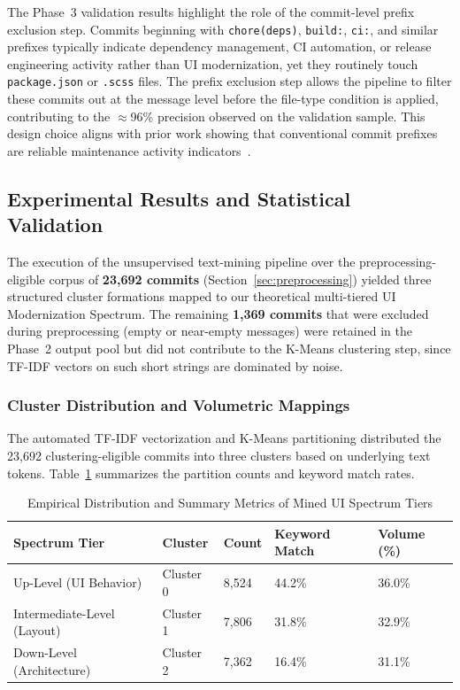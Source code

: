 \documentclass{article}
\begin{document}
The Phase~3 validation results highlight the role of the commit-level
prefix exclusion step. Commits beginning with \texttt{chore(deps)},
\texttt{build:}, \texttt{ci:}, and similar prefixes typically indicate
dependency management, CI automation, or release engineering activity
rather than UI modernization, yet they routinely touch
\texttt{package.json} or \texttt{.scss} files. The prefix exclusion
step allows the pipeline to filter these commits out at the message
level before the file-type condition is applied, contributing to the
$\approx$96\% precision observed on the validation sample. This
design choice aligns with prior work showing that conventional commit
prefixes are reliable maintenance activity
indicators~\cite{levin2017, herzig2013}.

\subsection{Experimental Results and Statistical Validation}

The execution of the unsupervised text-mining pipeline over the
preprocessing-eligible corpus of \textbf{23,692 commits}
(Section~\ref{sec:preprocessing}) yielded three structured cluster
formations mapped to our theoretical multi-tiered UI Modernization
Spectrum. The remaining \textbf{1,369 commits} that were excluded during
preprocessing (empty or near-empty messages) were retained in the
Phase~2 output pool but did not contribute to the K-Means clustering
step, since TF-IDF vectors on such short strings are dominated by noise.

\subsubsection{Cluster Distribution and Volumetric Mappings}

The automated TF-IDF vectorization and K-Means partitioning
\cite{salton1988, macqueen1967} distributed the 23,692 clustering-eligible
commits into three clusters based on underlying text tokens.
Table~\ref{tab:cluster_empirical_results} summarizes the partition counts
and keyword match rates.

\begin{table}[htbp]
\centering
\caption{Empirical Distribution and Summary Metrics of Mined UI Spectrum Tiers}
\label{tab:cluster_empirical_results}
\begin{tabularx}{\textwidth}{l X X X X}
\toprule
\textbf{Spectrum Tier} & \textbf{Cluster} & \textbf{Count} &
\textbf{Keyword Match} & \textbf{Volume (\%)} \\
\midrule
Up-Level (UI Behavior)      & Cluster 0 & 8,524 & 44.2\% & 36.0\% \\
Intermediate-Level (Layout) & Cluster 1 & 7,806 & 31.8\% & 32.9\% \\
Down-Level (Architecture)   & Cluster 2 & 7,362 & 16.4\% & 31.1\% \\
\bottomrule
\end{tabularx}
\end{table}
\end{document}
